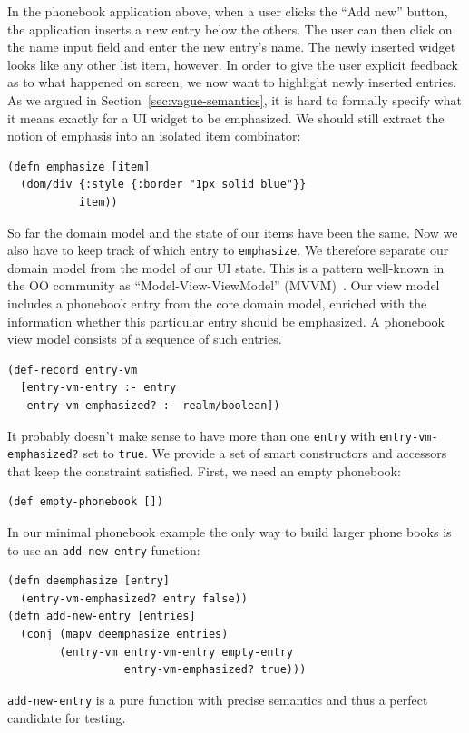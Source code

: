 \documentclass[sigplan,screen]{acmart}
\begin{document}
In the phonebook application above, when a user clicks the ``Add
new'' button, the application inserts a new entry below the others. The user can
then click on the name input field and enter the new entry's name. The
newly inserted widget looks like any other list item, however. In
order to give the user explicit feedback as to what happened on
screen, we now want to highlight newly inserted entries. As we argued
in Section~\ref{sec:vague-semantics}, it is hard to formally specify what it means exactly for a UI
widget to be emphasized. We should still extract the notion of
emphasis into an isolated item combinator:
%
\begin{verbatim}
(defn emphasize [item]
  (dom/div {:style {:border "1px solid blue"}}
           item))
\end{verbatim}
%
So far the domain model and the state of our items have been the same. Now
we also have to keep track of which entry to \texttt{emphasize}. We
therefore separate our domain model from the model of our UI state. This
is a pattern well-known in the OO community
as ``Model-View-ViewModel'' (MVVM)~\cite{MVVM}.
Our view model includes a phonebook entry from the core domain model,
enriched with the information whether this particular entry should be
emphasized. A phonebook view model consists of a sequence of such
entries.
%
\begin{verbatim}
(def-record entry-vm
  [entry-vm-entry :- entry
   entry-vm-emphasized? :- realm/boolean])
\end{verbatim}
%
It probably doesn't make sense to have more than one \texttt{entry} with
\texttt{entry-vm-emphasized?} set to \texttt{true}. We provide a set of smart
constructors and accessors that keep the constraint satisfied. First,
we need an empty phonebook:
%
\begin{verbatim}
(def empty-phonebook [])
\end{verbatim}
%
In our minimal phonebook example the only way to build larger phone
books is to use an \texttt{add-new-entry} function:
%
\begin{verbatim}
(defn deemphasize [entry]
  (entry-vm-emphasized? entry false))
(defn add-new-entry [entries]
  (conj (mapv deemphasize entries)
        (entry-vm entry-vm-entry empty-entry
                  entry-vm-emphasized? true)))
\end{verbatim}
%
\texttt{add-new-entry} is a pure function with precise semantics and
thus a perfect candidate for testing.
\end{document}

